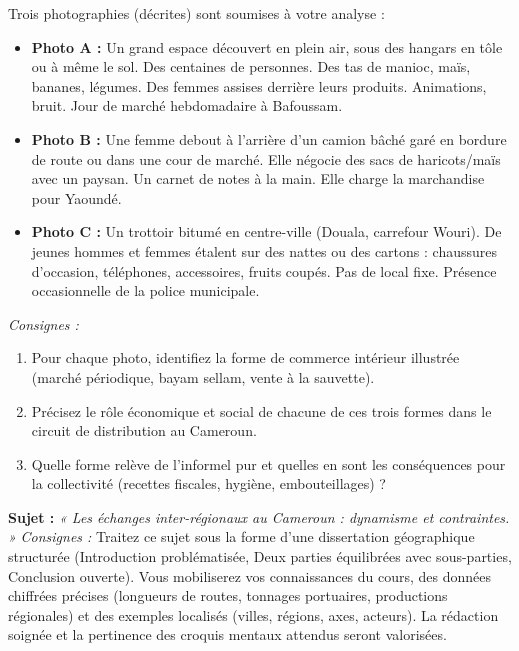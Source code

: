 \documentclass[11pt]{article}
\newcounter{popsec}
\newcounter{popsub}
\newcommand{\courssub}[1]{%
  \stepcounter{popsub}%
  \par\vspace{9pt}\noindent{\popxbold\fontsize{11.5}{13}\selectfont\color{popink}{\color{poporange}\thepopsec.\thepopsub}\hspace{6pt}#1}\par\nopagebreak\vspace{4pt}
}
\begin{document}
\begin{exercice}
Trois photographies (décrites) sont soumises à votre analyse :
\begin{itemize}
    \item \textbf{Photo A :} Un grand espace découvert en plein air, sous des hangars en tôle ou à même le sol. Des centaines de personnes. Des tas de manioc, maïs, bananes, légumes. Des femmes assises derrière leurs produits. Animations, bruit. Jour de marché hebdomadaire à Bafoussam.
    \item \textbf{Photo B :} Une femme debout à l'arrière d'un camion bâché garé en bordure de route ou dans une cour de marché. Elle négocie des sacs de haricots/maïs avec un paysan. Un carnet de notes à la main. Elle charge la marchandise pour Yaoundé.
    \item \textbf{Photo C :} Un trottoir bitumé en centre-ville (Douala, carrefour Wouri). De jeunes hommes et femmes étalent sur des nattes ou des cartons : chaussures d'occasion, téléphones, accessoires, fruits coupés. Pas de local fixe. Présence occasionnelle de la police municipale.
\end{itemize}
\emph{Consignes :}
\begin{enumerate}
    \item Pour chaque photo, identifiez la forme de commerce intérieur illustrée (marché périodique, bayam sellam, vente à la sauvette).
    \item Précisez le rôle économique et social de chacune de ces trois formes dans le circuit de distribution au Cameroun.
    \item Quelle forme relève de l'informel pur et quelles en sont les conséquences pour la collectivité (recettes fiscales, hygiène, embouteillages) ?
\end{enumerate}
\end{exercice}

\courssub{Je me prépare au Bac}

\begin{exercice}
\textbf{Sujet :} \emph{« Les échanges inter-régionaux au Cameroun : dynamisme et contraintes. »}
\emph{Consignes :} Traitez ce sujet sous la forme d'une dissertation géographique structurée (Introduction problématisée, Deux parties équilibrées avec sous-parties, Conclusion ouverte). Vous mobiliserez vos connaissances du cours, des données chiffrées précises (longueurs de routes, tonnages portuaires, productions régionales) et des exemples localisés (villes, régions, axes, acteurs). La rédaction soignée et la pertinence des croquis mentaux attendus seront valorisées.
\end{exercice}
\end{document}

